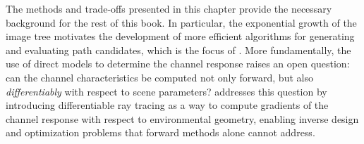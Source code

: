The methods and trade-offs presented in this chapter provide the necessary background for the rest of this book. In particular, the exponential growth of the image tree motivates the development of more efficient algorithms for generating and evaluating path candidates, which is the focus of . More fundamentally, the use of direct models to determine the channel response raises an open question: can the channel characteristics be computed not only forward, but also \emph{differentiably} with respect to scene parameters?  addresses this question by introducing differentiable ray tracing as a way to compute gradients of the channel response with respect to environmental geometry, enabling inverse design and optimization problems that forward methods alone cannot address.
